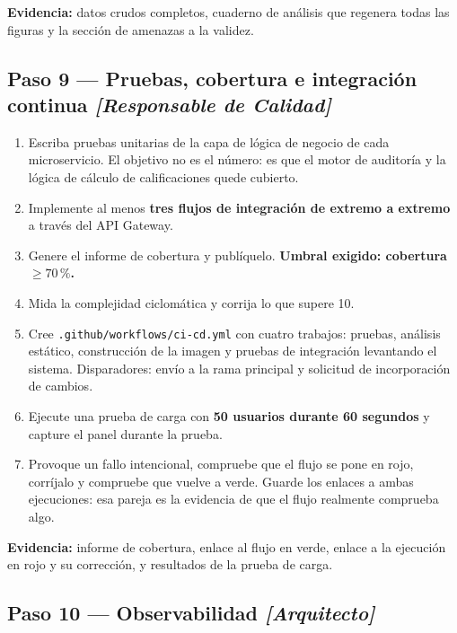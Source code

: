 \documentclass[11pt,a4paper]{article}
\newcommand{\paso}[1]{\subsection{#1}}
\begin{document}
	\textbf{Evidencia:} datos crudos completos, cuaderno de análisis que regenera todas las figuras y la sección de amenazas a la validez.
	
	\paso{Paso 9 --- Pruebas, cobertura e integración continua \emph{[Responsable de Calidad]}}
	
	\begin{enumerate}[leftmargin=*,itemsep=4pt]
		\item Escriba pruebas unitarias de la capa de lógica de negocio de cada microservicio. El objetivo no es el número: es que el motor de auditoría y la lógica de cálculo de calificaciones quede cubierto.
		\item Implemente al menos \textbf{tres flujos de integración de extremo a extremo} a través del API Gateway.
		\item Genere el informe de cobertura y publíquelo. \textbf{Umbral exigido: cobertura $\geq 70\,\%$.}
		\item Mida la complejidad ciclomática y corrija lo que supere 10.
		\item Cree \texttt{.github/workflows/ci-cd.yml} con cuatro trabajos: pruebas, análisis estático, construcción de la imagen y pruebas de integración levantando el sistema. Disparadores: envío a la rama principal y solicitud de incorporación de cambios.
		\item Ejecute una prueba de carga con \textbf{50 usuarios durante 60 segundos} y capture el panel durante la prueba.
		\item Provoque un fallo intencional, compruebe que el flujo se pone en rojo, corríjalo y compruebe que vuelve a verde. Guarde los enlaces a ambas ejecuciones: esa pareja es la evidencia de que el flujo realmente comprueba algo.
	\end{enumerate}
	
	\textbf{Evidencia:} informe de cobertura, enlace al flujo en verde, enlace a la ejecución en rojo y su corrección, y resultados de la prueba de carga.
	
	\paso{Paso 10 --- Observabilidad \emph{[Arquitecto]}}
	
\end{document}

